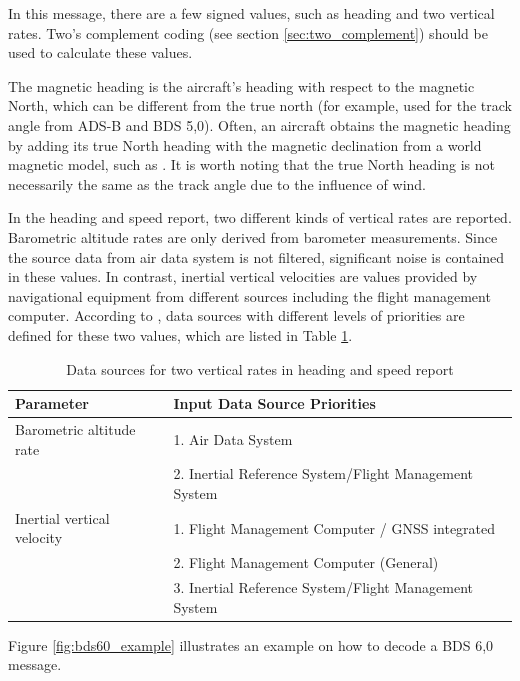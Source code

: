 In this message, there are a few signed values, such as heading and two vertical rates. Two's complement coding (see section \ref{sec:two_complement}) should be used to calculate these values.

The magnetic heading is the aircraft's heading with respect to the magnetic North, which can be different from the true north (for example, used for the track angle from ADS-B and BDS 5,0). Often, an aircraft obtains the magnetic heading by adding its true North heading with the magnetic declination from a world magnetic model, such as \cite{chulliat2015}. It is worth noting that the true North heading is not necessarily the same as the track angle due to the influence of wind.

In the heading and speed report, two different kinds of vertical rates are reported. Barometric altitude rates are only derived from barometer measurements. Since the source data from air data system is not filtered, significant noise is contained in these values. In contrast, inertial vertical velocities are values provided by navigational equipment from different sources including the flight management computer. According to \cite{icao9688}, data sources with different levels of priorities are defined for these two values, which are listed in Table \ref{tb:vertical_rate_source}.

\begin{table}[ht]
\footnotesize
\centering
\caption{Data sources for two vertical rates in heading and speed report}
\label{tb:vertical_rate_source}
\begin{tabular}{|l|l|}
\hline
\textbf{Parameter} & \textbf{Input Data Source Priorities} \\ \hline
Barometric altitude rate & 1. Air Data System\\ 
& 2. Inertial Reference System/Flight Management System \\ \hline
Inertial vertical velocity & 1. Flight Management Computer / GNSS integrated\\ 
& 2. Flight Management Computer (General)\\
& 3. Inertial Reference System/Flight Management System \\ \hline
\end{tabular}
\end{table}


Figure \ref{fig:bds60_example} illustrates an example on how to decode a BDS 6,0 message.

